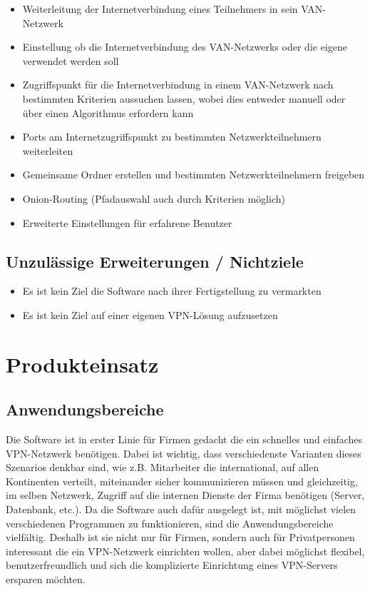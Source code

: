 \documentclass[a4paper,12pt]{scrreprt}
\begin{document}
	\begin{itemize}
	\item Weiterleitung der Internetverbindung eines Teilnehmers in sein VAN-Netzwerk
	\item Einstellung ob die Internetverbindung des VAN-Netzwerks oder die eigene verwendet werden soll
	\item Zugriffspunkt für die Internetverbindung in einem VAN-Netzwerk nach bestimmten Kriterien aussuchen lassen, wobei dies entweder manuell oder über einen Algorithmus erfordern kann
	\item Ports am Internetzugriffspunkt zu bestimmten Netzwerkteilnehmern weiterleiten
	\item Gemeinsame Ordner erstellen und bestimmten Netzwerkteilnehmern freigeben
	\item Onion-Routing (Pfadauswahl auch durch Kriterien möglich)
	\item Erweiterte Einstellungen für erfahrene Benutzer
	
	\end{itemize}
	
	\section{Unzulässige Erweiterungen / Nichtziele}
	
	\begin{itemize}
	\item Es ist kein Ziel die Software nach ihrer Fertigstellung zu vermarkten
	\item Es ist kein Ziel auf einer eigenen VPN-Lösung aufzusetzen
	
	\end{itemize}
	
	
\chapter{Produkteinsatz}
	
	\section{Anwendungsbereiche}
	 Die Software ist in erster Linie für Firmen gedacht die ein schnelles und einfaches VPN-Netzwerk benötigen. Dabei ist wichtig, dass verschiedenste Varianten dieses Szenarios denkbar sind, wie z.B. Mitarbeiter die international, auf allen Kontinenten verteilt, miteinander sicher kommunizieren müssen und gleichzeitig, im selben Netzwerk, Zugriff auf die internen Dienste der Firma benötigen (Server, Datenbank, etc.). Da die Software auch dafür ausgelegt ist, mit möglichst vielen verschiedenen Programmen zu funktionieren, sind die Anwendungsbereiche vielfältig. Deshalb ist sie nicht nur für Firmen, sondern auch für Privatpersonen interessant die ein VPN-Netzwerk einrichten wollen, aber dabei möglichst flexibel, benutzerfreundlich und sich die komplizierte Einrichtung eines VPN-Servers ersparen möchten. 
\end{document}
